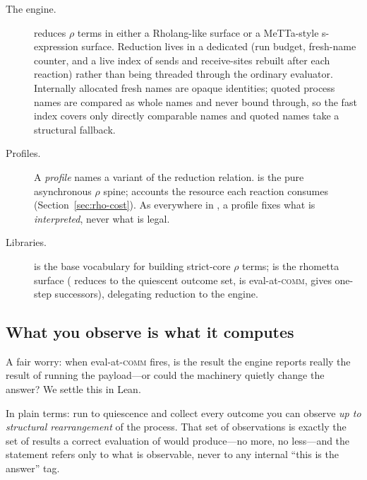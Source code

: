 \begin{description}
\item[The engine.]  reduces $\rho$ terms in either a
  Rholang-like  surface or a MeTTa-style s-expression 
  surface.  Reduction lives in a dedicated  (run budget,
  fresh-name counter, and a live index of sends and receive-sites rebuilt after
  each reaction) rather than being threaded through the ordinary evaluator.
  Internally allocated fresh names are opaque identities; quoted process names
  are compared as whole names and never bound through, so the fast index covers
  only directly comparable names and quoted names take a structural fallback.
\item[Profiles.] A \emph{profile} names a variant of the reduction relation.
   is the pure asynchronous $\rho$ spine;  accounts
  the resource each reaction consumes (Section~\ref{sec:rho-cost}).  As
  everywhere in \CeTTa{}, a profile fixes what is \emph{interpreted}, never what
  is legal.
\item[Libraries.]  is the base vocabulary for building
  strict-core $\rho$ terms;  is the rhometta surface
  ( reduces to the quiescent outcome set,
   is eval-at-\textsc{comm}, 
  gives one-step successors), delegating reduction to the engine.
\end{description}

\subsection{What you observe is what it computes}
\label{sec:rho-lean}

A fair worry: when eval-at-\textsc{comm} fires, is the result the engine reports
really the result of running the payload---or could the machinery quietly change
the answer?  We settle this in Lean.

In plain terms: run  to quiescence and collect every
outcome you can observe \emph{up to structural rearrangement} of the process.
That set of observations is exactly the set of results a correct evaluation of
 would produce---no more, no less---and the statement refers only to what
is observable, never to any internal ``this is the answer'' tag.

